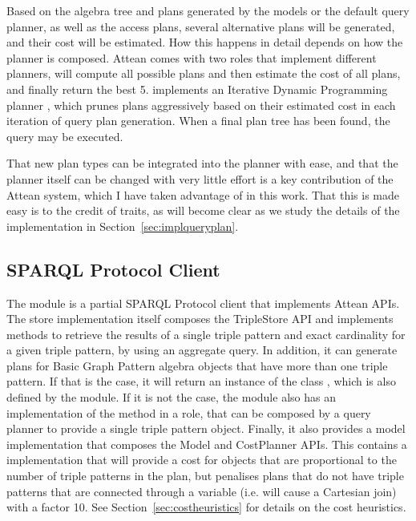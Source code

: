 Based on the algebra tree and plans generated by the models or the
default query planner, as well as the access plans, several
alternative plans will be generated, and their cost will be
estimated. How this happens in detail depends on how the planner is
composed. Attean comes with two roles that implement different
planners,  will compute all
possible plans and then estimate the cost of all plans, and finally
return the best 5. 
implements an Iterative Dynamic Programming planner
\cite{Kossmann:2000:IDP:352958.352982}, which prunes plans
aggressively based on their estimated cost in each iteration of query
plan generation. When a final plan tree has been found, the query may
be executed. 

That new plan types can be integrated into the planner with ease, and
that the planner itself can be changed with very little effort is a
key contribution of the Attean system, which I have taken advantage of
in this work. That this is made easy is to the credit of traits, as
will become clear as we study the details of the implementation in
Section~\ref{sec:implqueryplan}.


\subsection{SPARQL Protocol Client}\label{sec:sparqlclient}

The  module is a partial SPARQL
Protocol client that implements Attean APIs. The store implementation
itself composes the \mbox{TripleStore} API and implements methods to retrieve
the results of a single triple pattern and exact cardinality for a
given triple pattern, by using an aggregate query. In addition, it can
generate plans for Basic Graph Pattern algebra objects that have more
than one triple pattern. If that is the case, it will return an
instance of the class , which is
also defined by the module. If it is not the case, the module also has
an implementation of the  method in a
 role, that can be
composed by a query planner to provide a single triple pattern
 object. Finally, it also provides a
model implementation that composes the Model and \mbox{CostPlanner}
APIs. This contains a  implementation that will
provide a cost for  objects that are
proportional to the number of triple patterns in the plan, but
penalises plans that do not have triple patterns that are connected
through a variable (i.e. will cause a Cartesian join) with a factor
10. See Section~\ref{sec:costheuristics} for details on the cost
heuristics.

